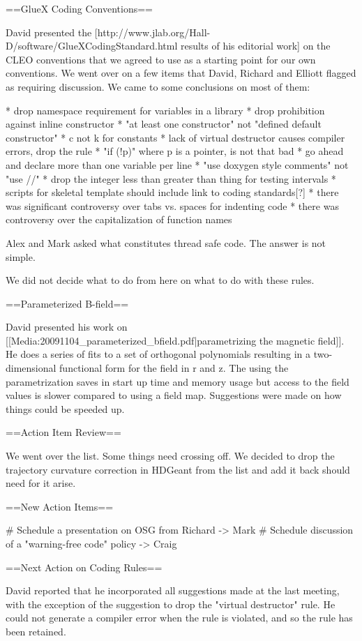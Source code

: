 \documentclass[xcolor=dvipsnames]{beamer}
\begin{document}
{==GlueX Coding Conventions==

David presented the [http://www.jlab.org/Hall-D/software/GlueXCodingStandard.html results of his editorial work] on the CLEO conventions that we agreed to use as a starting point for our own conventions. We went over on a few items that David, Richard and Elliott flagged as requiring discussion. We came to some conclusions on most of them:

* drop namespace requirement for variables in a library
* drop prohibition against inline constructor
* "at least one constructor" not "defined default constructor"
* c not k for constants
* lack of virtual destructor causes compiler errors, drop the rule
* "if (!p)" where p is a pointer, is not that bad
* go ahead and declare more than one variable per line
* "use doxygen style comments" not "use //"
* drop the integer less than greater than thing for testing intervals
* scripts for skeletal template should include link to coding standards[?]
* there was significant controversy over tabs vs. spaces for indenting code
* there was controversy over the capitalization of function names

Alex and Mark asked what constitutes thread safe code. The answer is not simple.

We did not decide what to do from here on what to do with these rules.

==Parameterized B-field==

David presented his work on [[Media:20091104_parameterized_bfield.pdf|parametrizing the magnetic field]]. He does a series of fits to a set of orthogonal polynomials resulting in a two-dimensional functional form for the field in r and z. The using the parametrization saves in start up time and memory usage but access to the field values is slower compared to using a field map. Suggestions were made on how things could be speeded up.

==Action Item Review==

We went over the list. Some things need crossing off. We decided to drop the trajectory curvature correction in HDGeant from the list and add it back should need for it arise.

==New Action Items==

# Schedule a presentation on OSG from Richard -> Mark
# Schedule discussion of a "warning-free code" policy -> Craig

==Next Action on Coding Rules==

David reported that he incorporated all suggestions made at the last meeting, with the exception of the suggestion to drop the "virtual destructor" rule. He could not generate a compiler error when the rule is violated, and so the rule has been retained.

}
\end{document}
